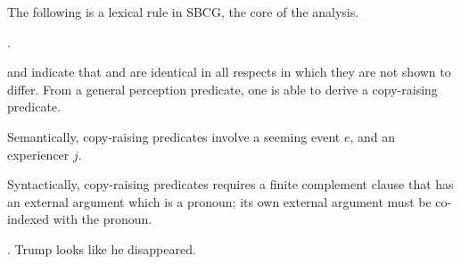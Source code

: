 \documentclass[11pt]{article}
\begin{document}
The following is a lexical rule in SBCG, the core of the analysis.

\ex. 

 and  indicate that \avm{[A]} and \avm{[B]} are identical in all respects in which they are not shown to differ.
From a general perception predicate, one is able to derive a copy-raising predicate.

Semantically, copy-raising predicates involve a seeming event \(e\), and an experiencer \(j\).

Syntactically, copy-raising predicates requires a finite complement clause that has an external argument which is a pronoun; its own external argument must be co-indexed with the pronoun.

\ex. Trump looks like he disappeared.
\end{document}
